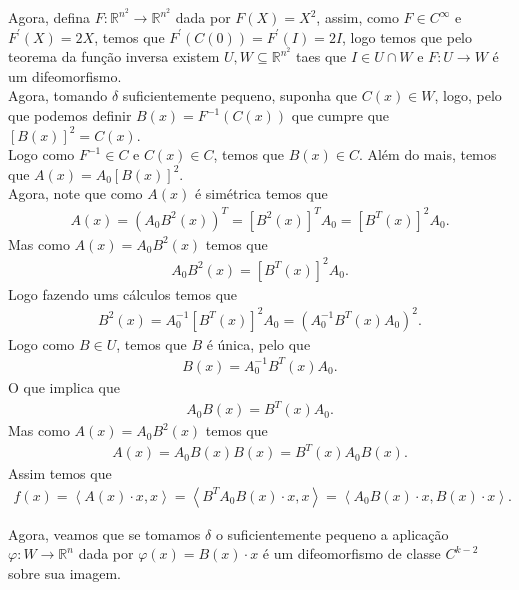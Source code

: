 \begin{homeworkProblem}[Seção 3-9]
\begin{solution}
    Agora, defina $F:\mathbb{R}^{n^{2}}\to\mathbb{R}^{n^{2}}$ dada por $F(X)=X^{2}$, assim, como $F\in C^{\infty}$ e $F^{\prime}(X)=2X$, temos que $F^{\prime}(C(0))=F^{\prime}(I)=2I$, logo temos que pelo teorema da função inversa existem $U,W\subseteq\mathbb{R}^{n^{2}}$ taes que $I\in U\cap W$ e $F:U\to W$ é um difeomorfismo.\\
    Agora, tomando $\delta$ suficientemente pequeno, suponha que $C(x)\in W$, logo, pelo que podemos definir $B(x)=F^{-1}(C(x))$ que cumpre que $\left[B(x)\right]^{2}=C(x)$.\\
    Logo como $F^{-1}\in C$ e $C(x)\in C$, temos que $B(x)\in C$. Além do mais, temos que $A(x)=A_0\left[ B(x) \right]^{2}$.\\

    Agora, note que como $A(x)$ é simétrica temos que
    \begin{align*}
      A(x)=\left( A_0B^{2}(x) \right)^{T}=\left[B^{2}(x)\right]^{T}A_0=\left[B^{T}(x)\right]^{2}A_0.
    \end{align*}
    Mas como $A(x)=A_0B^{2}(x)$ temos que
    \begin{align*}
        A_0B^{2}(x)=\left[B^{T}(x)\right]^{2}A_0.
    \end{align*}
    Logo fazendo ums cálculos temos que
    \begin{align*}
      B^{2}(x)=A_0^{-1}\left[ B^{T}(x) \right]^{2}A_0=\left( A_0^{-1}B^{T}(x)A_0 \right)^{2}.
    \end{align*}
    Logo como $B\in U$, temos que $B$ é única, pelo que
    \begin{align*}
      B(x)=A_0^{-1}B^{T}(x)A_0.
    \end{align*}
    O que implica que
    \begin{align*}
      A_0B(x)=B^{T}(x)A_0.
    \end{align*}
    Mas como $A(x)=A_0B^{2}(x)$ temos que
    \begin{align*}
      A(x)=A_0B(x)B(x)=B^{T}(x)A_0B(x).
    \end{align*}
    Assim temos que
    \begin{align*}
      f(x)=\left\langle A(x)\cdot x,x \right\rangle=\left\langle  B^{T}A_0B(x)\cdot x,x\right\rangle=\left\langle A_0B(x)\cdot x,B(x)\cdot x \right\rangle.
    \end{align*}

    Agora, veamos que se tomamos $\delta$ o suficientemente pequeno a aplicação $\varphi:W\to\mathbb{R}^{n}$ dada por $\varphi(x)=B(x)\cdot x$ é um difeomorfismo de classe $C^{k-2}$ sobre sua imagem.\\


\end{solution}
\end{homeworkProblem}
